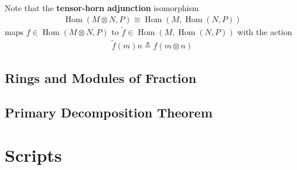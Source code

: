 \documentclass{report}
\begin{document}
Note that the \textbf{tensor-horn adjunction} isomorphism 
\begin{align*}
\operatorname{Hom}(M\otimes N,P) \cong  \operatorname{Hom}(M,\operatorname{Hom}(N,P))
\end{align*}
maps $f \in \operatorname{Hom}(M\otimes N,P)$ to   $\tilde{f}\in \operatorname{Hom}(M,\operatorname{Hom}(N,P))$ with the action
\begin{align*}
  \tilde{f}(m)n\triangleq f(m\otimes n)
\end{align*}
\section{Rings and Modules of Fraction}
\section{Primary Decomposition Theorem}


\chapter{Scripts}
\end{document}
